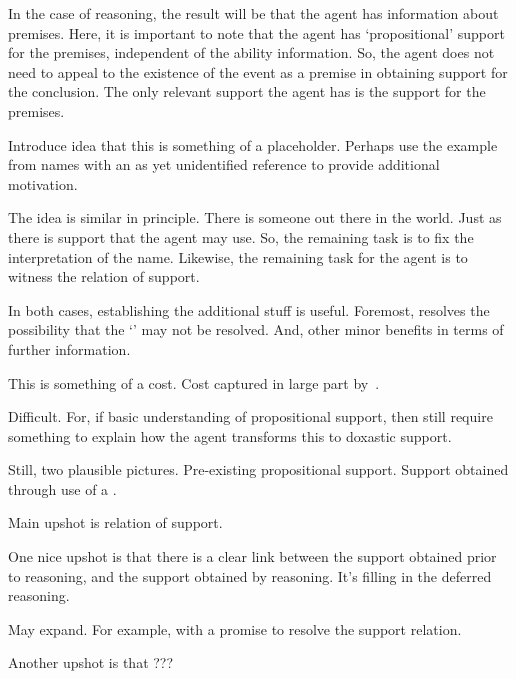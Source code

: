 \begin{note}
  In the case of reasoning, the result will be that the agent has information about premises.
  Here, it is important to note that the agent has `propositional' support for the premises, independent of the ability information.
  So, the agent does not need to appeal to the existence of the event as a premise in obtaining support for the conclusion.
  The only relevant support the agent has is the support for the premises.
\end{note}

\begin{note}
  Introduce idea that this is something of a placeholder.
  Perhaps use the example from names with an as yet unidentified reference to provide additional motivation.

  The idea is similar in principle.
  There is someone out there in the world.
  Just as there is support that the agent may use.
  So, the remaining task is to fix the interpretation of the name.
  Likewise, the remaining task for the agent is to witness the relation of support.

  In both cases, establishing the additional stuff is useful.
  Foremost, resolves the possibility that the `\future{}' may not be resolved.
  And, other minor benefits in terms of further information.
\end{note}

\begin{note}
  This is something of a cost.
  Cost captured in large part by~\uRa{}.

  Difficult.
  For, if basic understanding of propositional support, then still require something to explain how the agent transforms this to doxastic support.

  Still, two plausible pictures.
  Pre-existing propositional support.
  Support obtained through use of a \future{}.
\end{note}

\begin{note}[Upshot]
  Main upshot is relation of support.

  One nice upshot is that there is a clear link between the support obtained prior to reasoning, and the support obtained by reasoning.
  It's filling in the deferred reasoning.

  May expand.
  For example, with a promise to resolve the support relation.

  Another upshot is that ???
\end{note}



